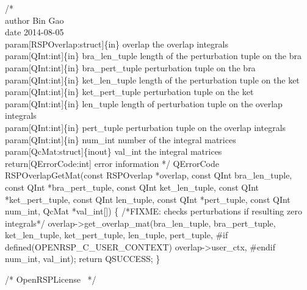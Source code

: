 /*%
    \\author Bin Gao
    \\date 2014-08-05
    \\param[RSPOverlap:struct]\{in\} overlap the overlap integrals
    \\param[QInt:int]\{in\} bra_len_tuple length of the perturbation tuple on the bra
    \\param[QInt:int]\{in\} bra_pert_tuple perturbation tuple on the bra
    \\param[QInt:int]\{in\} ket_len_tuple length of the perturbation tuple on the ket
    \\param[QInt:int]\{in\} ket_pert_tuple perturbation tuple on the ket
    \\param[QInt:int]\{in\} len_tuple length of perturbation tuple on the overlap integrals
    \\param[QInt:int]\{in\} pert_tuple perturbation tuple on the overlap integrals
    \\param[QInt:int]\{in\} num_int number of the integral matrices
    \\param[QcMat:struct]\{inout\} val_int the integral matrices
    \\return[QErrorCode:int] error information
*/
QErrorCode RSPOverlapGetMat(const RSPOverlap *overlap,
                            const QInt bra_len_tuple,
                            const QInt *bra_pert_tuple,
                            const QInt ket_len_tuple,
                            const QInt *ket_pert_tuple,
                            const QInt len_tuple,
                            const QInt *pert_tuple,
                            const QInt num_int,
                            QcMat *val_int[])
\{
/*FIXME: checks perturbations if resulting zero integrals*/
    overlap->get_overlap_mat(bra_len_tuple,
                             bra_pert_tuple,
                             ket_len_tuple,
                             ket_pert_tuple,
                             len_tuple,
                             pert_tuple,
#if defined(OPENRSP_C_USER_CONTEXT)
                             overlap->user_ctx,
#endif
                             num_int,
                             val_int);
    return QSUCCESS;
\}

\nwendcode{}\endmoddef
/*
  \LA{}OpenRSPLicense~{\nwtagstyle{}}\RA{}
*/

